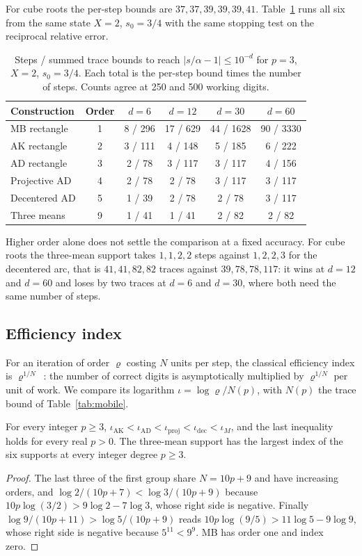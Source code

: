 For cube roots the per-step bounds are $37,37,39,39,39,41$. Table~\ref{tab:cubic} runs all six from the
same state $X=2$, $s_0=3/4$ with the same stopping test on the reciprocal relative error.

\begin{table}[h]
\centering\small
\caption{Steps / summed trace bounds to reach $|s/\alpha-1|\le10^{-d}$ for $p=3$, $X=2$, $s_0=3/4$.
Each total is the per-step bound times the number of steps. Counts agree at 250 and 500 working
digits.}\label{tab:cubic}
\begin{tabular}{@{}lccccc@{}}
\toprule
Construction & Order & $d=6$ & $d=12$ & $d=30$ & $d=60$\\
\midrule
MB rectangle & 1 & 8 / 296 & 17 / 629 & 44 / 1628 & 90 / 3330\\
AK rectangle & 2 & 3 / 111 & 4 / 148 & 5 / 185 & 6 / 222\\
AD rectangle & 3 & 2 / 78 & 3 / 117 & 3 / 117 & 4 / 156\\
Projective AD & 4 & 2 / 78 & 2 / 78 & 3 / 117 & 3 / 117\\
Decentered AD & 5 & 1 / 39 & 2 / 78 & 2 / 78 & 3 / 117\\
Three means & 9 & 1 / 41 & 1 / 41 & 2 / 82 & 2 / 82\\
\bottomrule
\end{tabular}
\end{table}

Higher order alone does not settle the comparison at a fixed accuracy. For cube roots the three-mean
support takes $1,1,2,2$ steps against $1,2,2,3$ for the decentered arc, that is $41,41,82,82$ traces
against $39,78,78,117$: it wins at $d=12$ and $d=60$ and loses by two traces at $d=6$ and $d=30$, where
both need the same number of steps.

\subsection{Efficiency index}

For an iteration of order $\varrho$ costing $N$ units per step, the classical efficiency index is
$\varrho^{1/N}$~\cite{ostrowski,traub64}: the number of correct digits is asymptotically multiplied by
$\varrho^{1/N}$ per unit of work. We compare its logarithm $\iota=\log\varrho/N(p)$, with $N(p)$ the
trace bound of Table~\ref{tab:mobile}.

\begin{proposition}\label{prop:index}
For every integer $p\ge3$,
$\iota_{\mathrm{AK}}<\iota_{\mathrm{AD}}<\iota_{\mathrm{proj}}<\iota_{\mathrm{dec}}<\iota_{M}$, and the
last inequality holds for every real $p>0$. The three-mean support has the largest index of the six
supports at every integer degree $p\ge3$.
\end{proposition}
\begin{proof}
The last three of the first group share $N=10p+9$ and have increasing orders, and
$\log2/(10p+7)<\log3/(10p+9)$ because $10p\log(3/2)>9\log2-7\log3$, whose right side is negative.
Finally $\log9/(10p+11)>\log5/(10p+9)$ reads $10p\log(9/5)>11\log5-9\log9$, whose right side is
negative because $5^{11}<9^{9}$. MB has order one and index zero.
\end{proof}


